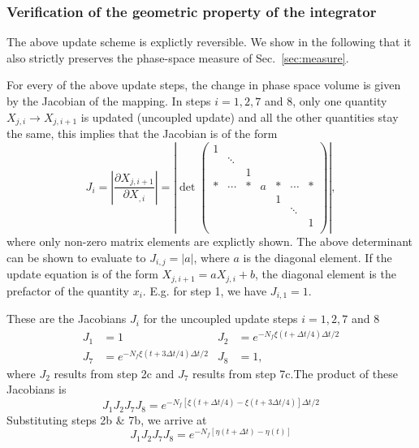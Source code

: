 \documentclass[12pt,letter]{article}
\begin{document}
\subsubsection{Verification of the geometric property of the integrator}
The above update scheme is explictly reversible. We show in the following that it also strictly preserves the phase-space measure of Sec.~\ref{sec:measure}.

For every of the above update steps, the change in phase space volume
is given by the Jacobian of the mapping. In steps $i=1,2, 7$ and $8$,
only one quantity $X_{j,i} \to X_{j,i+1}$ is updated (uncoupled update) and all the other
quantities stay the same, this implies that the Jacobian is of the
form
\begin{equation}
J_{i} = \left|\frac{\partial X_{j,i+1}}{\partial X_{,i}}\right|=\left|\det\begin{pmatrix}
1 &        &   &        &        &    \\
  & \ddots &   &        &        &    \\
  &        & 1 &        &        &    \\
* & \cdots & * & a & *  & \cdots & *  \\
  &        &   &   & 1  &        &    \\ 
  &        &   &   &    & \ddots &    \\
  &        &   &   &    &        & 1  \\
\end{pmatrix}\right|,
\end{equation}
where only non-zero matrix elements are explictly shown. The above
determinant can be shown to evaluate to $J_{i,j}=|a|$, where $a$ is the 
diagonal element. If the update equation is of the form $X_{j,i+1} = a
X_{j,i} + b$, the diagonal element is the prefactor of the quantity
$x_i$. E.g. for step 1, we have $J_{i,1} = 1$.

These are the Jacobians $J_i$ for the uncoupled update steps $i=1,2, 7$ and $8$
\begin{align}
J_1&= 1 &
J_2& = e^{-N_f \xi(t+\Delta t/4)\Delta t/2} \\
J_7 &= e^{-N_f \xi(t+3 \Delta t/4) \Delta t/2}&
J_8 &= 1,
\end{align}
where $J_2$ results from step 2c and $J_7$ results from step 7c.The product of these Jacobians is
\begin{equation}
J_1 J_2 J_7 J_8 = e^{-N_f \left[\xi(t+\Delta t/4) - \xi(t+3 \Delta t/4)\right]\Delta t/2}
\end{equation}
Substituting steps 2b \& 7b, we arrive at
\begin{equation}
J_1 J_2 J_7 J_8 = e^{-N_f \left[\eta (t + \Delta t) - \eta (t)\right]} \label{eq:jacobi_eta}
\end{equation}
\end{document}
